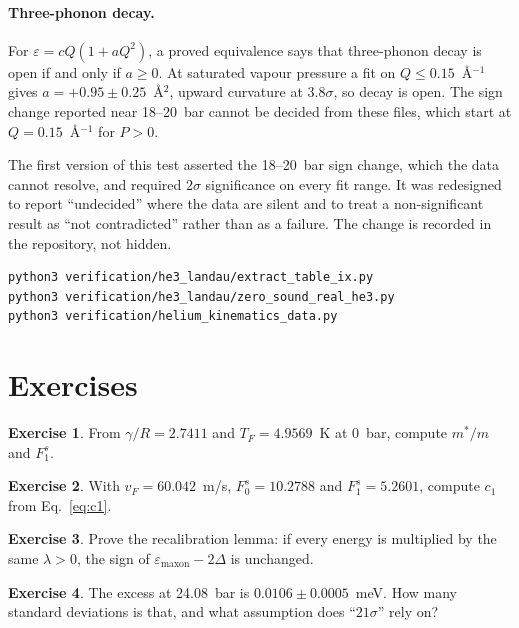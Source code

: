 \documentclass[11pt,a4paper,openany]{book}
\newcommand{\Fzs}{F_0^{s}}
\newcommand{\Fos}{F_1^{s}}
\theoremstyle{definition}
\newtheorem{exercise}{Exercise}[chapter]
\theoremstyle{plain}
\begin{document}
\paragraph{Three-phonon decay.} For $\varepsilon=cQ(1+aQ^2)$, a proved equivalence says that
three-phonon decay is open if and only if $a\ge0$. At saturated vapour pressure a fit on
$Q\le0.15$~\AA$^{-1}$ gives $a=+0.95\pm0.25$~\AA$^2$, upward curvature at $3.8\sigma$, so decay is
open. The sign change reported near 18--20~bar cannot be decided from these files, which start
at $Q=0.15$~\AA$^{-1}$ for $P>0$.

\begin{lesson}
The first version of this test asserted the 18--20~bar sign change, which the data cannot
resolve, and required $2\sigma$ significance on every fit range. It was redesigned to report
``undecided'' where the data are silent and to treat a non-significant result as ``not
contradicted'' rather than as a failure. The change is recorded in the repository, not hidden.
\end{lesson}

\begin{runit}
\begin{verbatim}
python3 verification/he3_landau/extract_table_ix.py
python3 verification/he3_landau/zero_sound_real_he3.py
python3 verification/helium_kinematics_data.py
\end{verbatim}
\end{runit}

\section*{Exercises}
\begin{exercise}\label{ex:mstar}
From $\gamma/R=2.7411$ and $T_F=4.9569$~K at 0~bar, compute $m^*/m$ and $\Fos$.
\end{exercise}
\begin{exercise}\label{ex:c1}
With $v_F=60.042$~m/s, $\Fzs=10.2788$ and $\Fos=5.2601$, compute $c_1$ from Eq.~\eqref{eq:c1}.
\end{exercise}
\begin{exercise}\label{ex:recal}
Prove the recalibration lemma: if every energy is multiplied by the same $\lambda>0$, the sign of
$\varepsilon_{\text{maxon}}-2\Delta$ is unchanged.
\end{exercise}
\begin{exercise}\label{ex:sigma}
The excess at 24.08~bar is $0.0106\pm0.0005$~meV. How many standard deviations is that, and what
assumption does ``$21\sigma$'' rely on?
\end{exercise}
\end{document}
